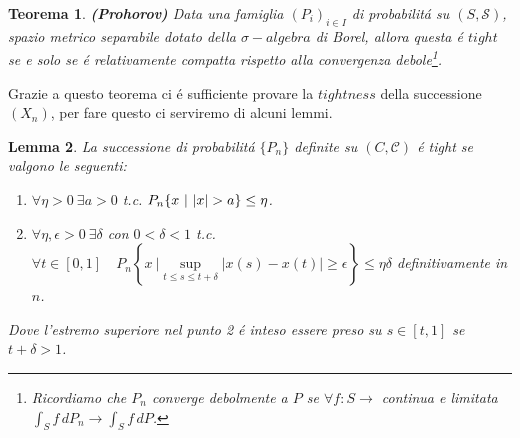 \documentclass[11pt, twoside]{report}
\theoremstyle{definition}
\theoremstyle{plain}
\newtheorem{teo}{Teorema}[chapter]
\newtheorem{lemma}[teo]{Lemma}
\theoremstyle{remark}
\numberwithin{equation}{chapter}
\begin{document}
\begin{teo}{\textbf{(Prohorov)}} Data una famiglia $(P_i)_{i \in I}$ di probabilit\'a su $(S,\mathscr{S})$, spazio metrico separabile dotato della $\sigma -algebra$ di Borel, allora questa \'e $tight$ se e solo se \'e relativamente compatta rispetto alla convergenza debole\footnote{Ricordiamo che $P_n$ converge debolmente a $P$ se $\forall f:S \rightarrow $ continua e limitata $\int_{S}f \, dP_n \rightarrow \int_{S} f \,dP$.}.
\end{teo}

Grazie a questo teorema ci \'e sufficiente provare la $tightness$ della successione $(X_n)$, per fare questo ci serviremo di alcuni lemmi.

\begin{lemma} \label{lem_1} La successione di probabilit\'a $\{P_n\}$ definite su $(C, \mathscr C)$ \'e tight se valgono le seguenti:
\begin{enumerate}

\item $\forall \eta >0 \ \exists a > 0$ t.c. $P_n\{x \ | \ \abs{x} >a\}\leq \eta$.

\item $\forall \eta, \epsilon >0 \ \exists \delta$ con $ 0< \delta <1 $ t.c. $\forall t \in [0,1] \quad P_n\left\{x \  \Bigg|  \sup\limits_{t\leq s\leq t+\delta}|x(s)-x(t)|\geq \epsilon \right\} \leq \eta \delta$  definitivamente in $n$.

\end{enumerate}
Dove l'estremo superiore nel punto 2 \'e inteso essere preso su $s \in [t,1] $ se $t+\delta>1$.
\end{lemma}
\end{document}
